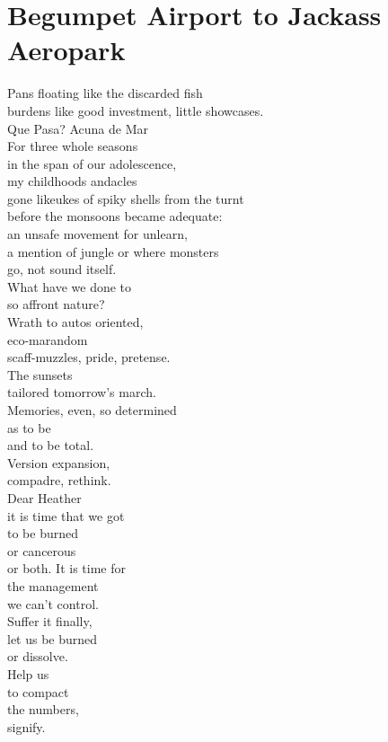 \documentclass[smalldemyvopaper,11pt,twoside,onecolumn,openright,extrafontsizes]{memoir}
\begin{document}
\chapter{Begumpet Airport to Jackass Aeropark}
Pans floating like the discarded fish
\\burdens like good investment, little showcases.
\\Que Pasa? Acuna de Mar
\\For three whole seasons
\\in the span of our adolescence,
\\my childhoods andacles
\\gone likeukes of spiky shells from the turnt
\\before the monsoons became adequate:
\\an unsafe movement for unlearn,
\\a mention of jungle or where monsters
\\go, not sound itself.
\\What have we done to
\\so affront nature?
\\Wrath to autos oriented,
\\eco-marandom
\\scaff-muzzles, pride, pretense.
\\The sunsets
\\tailored tomorrow's march.
\\Memories, even, so determined
\\as to be
\\and to be total.
\\Version expansion,
\\compadre, rethink.
\\Dear Heather
\\it is time that we got
\\to be burned
\\or cancerous
\\or both. It is time for
\\the management
\\we can't control.
\\Suffer it finally,
\\let us be burned
\\or dissolve.
\\Help us
\\to compact
\\the numbers,
\\signify.
\end{document}
